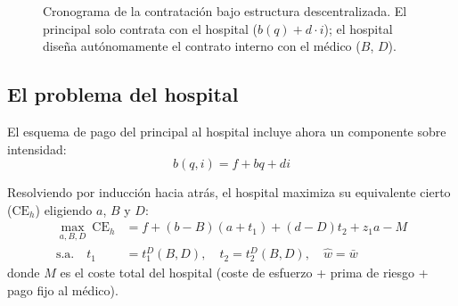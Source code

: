 \documentclass[12pt, a4paper, twoside, openright]{book}
\newcommand{\CE}{\mathrm{CE}}
\theoremstyle{plain}
\theoremstyle{definition}
\theoremstyle{remark}
\begin{document}
\begin{figure}[htbp]
\centering
{}%
\caption{Cronograma de la contratación bajo estructura descentralizada.
  El principal solo contrata con el hospital ($b(q) + d \cdot i$);
  el hospital diseña autónomamente el contrato interno
  con el médico ($B$, $D$).}
\label{fig:cronograma_d}
\end{figure}
\subsection{El problema del hospital}

El esquema de pago del principal al hospital incluye ahora un componente sobre intensidad:
\begin{equation}
  b(q,i) = f + bq + di
  \label{eq:pago_h_desc}
\end{equation}

Resolviendo por inducción hacia atrás, el hospital maximiza su equivalente cierto ($\CE_h$) eligiendo $a$, $B$ y $D$:
\begin{align*}
  \max_{a,B,D}\ \CE_h &= f+(b-B)(a+t_1)+(d-D)t_2+z_1a-M\\
  \text{s.a.}\quad t_1 &= t_1^{D}(B,D), \quad t_2 = t_2^{D}(B,D), \quad \widehat{w}=\bar{w}
\end{align*}
donde $M$ es el coste total del hospital (coste de esfuerzo + prima de riesgo + pago fijo al médico).
\end{document}
